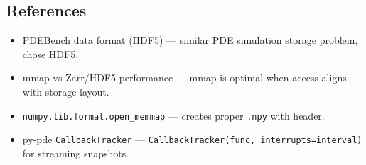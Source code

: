 \subsection{References}
\label{sec:adr-references}

\begin{itemize}
  \item PDEBench data format (HDF5) --- similar PDE simulation storage problem, chose HDF5.
  \item mmap vs Zarr/HDF5 performance --- mmap is optimal when access aligns with storage layout.
  \item \texttt{numpy.lib.format.open\_memmap} --- creates proper \texttt{.npy} with header.
  \item py-pde \texttt{CallbackTracker} --- \texttt{CallbackTracker(func, interrupts=interval)} for streaming snapshots.
\end{itemize}
